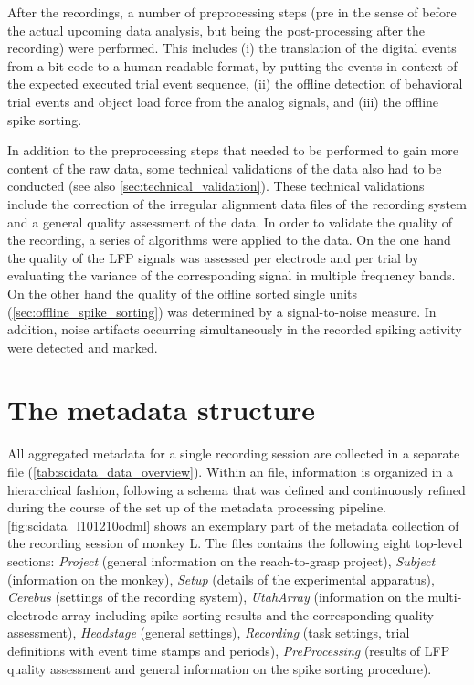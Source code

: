 After the recordings, a number of preprocessing steps (pre in the sense of before the actual upcoming data analysis, but being the post-processing after the recording) were performed. This includes (i) the translation of the digital events from a bit code to a human-readable format, by putting the events in context of the expected executed trial event sequence, (ii) the offline detection of behavioral trial events and object load force from the analog signals, and (iii) the offline spike sorting.

In addition to the preprocessing steps that needed to be performed to gain more content of the raw data, some technical validations of the data also had to be conducted (see also \cref{sec:technical_validation}). These technical validations include the correction of the irregular alignment data files of the recording system and a general quality assessment of the data. In order to validate the quality of the recording, a series of algorithms were applied to the data. On the one hand the quality of the LFP signals was assessed per electrode and per trial by evaluating the variance of the corresponding signal in multiple frequency bands. On the other hand the quality of the offline sorted single units (\cref{sec:offline_spike_sorting}) was determined by a signal-to-noise measure. In addition, noise artifacts occurring simultaneously in the recorded spiking activity were detected and marked.

\section{The metadata structure}
\label{sec:scidata_metadata_structure}
All aggregated metadata for a single recording session are collected in a separate  file (\cref{tab:scidata_data_overview}). Within an  file, information is organized in a hierarchical fashion, following a schema that was defined and continuously refined during the course of the set up of the metadata processing pipeline. \cref{fig:scidata_l101210odml} shows an exemplary part of the metadata collection of the recording session of monkey L. The  files contains the following eight top-level sections: \textit{Project} (general information on the reach-to-grasp project), \textit{Subject} (information on the monkey), \textit{Setup} (details of the experimental apparatus), \textit{Cerebus} (settings of the recording system), \textit{UtahArray} (information on the multi-electrode array including spike sorting results and the corresponding quality assessment), \textit{Headstage} (general settings), \textit{Recording} (task settings, trial definitions with event time stamps and periods), \textit{PreProcessing} (results of LFP quality assessment and general information on the spike sorting procedure).

